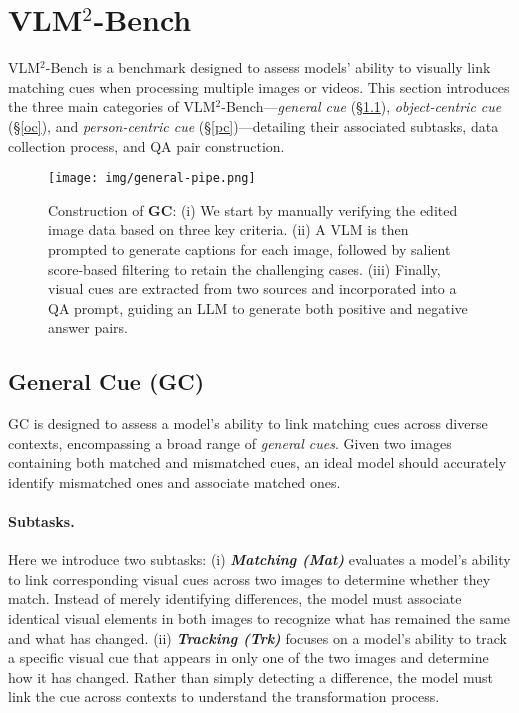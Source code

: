 \section{VLM$^2$-Bench}
VLM$^2$-Bench is a benchmark designed to assess models' ability to visually link matching cues when processing multiple images or videos. This section introduces the three main categories of VLM$^2$-Bench—\textit{general cue} (\S\ref{gc}), \textit{object-centric cue} (\S\ref{oc}), and \textit{person-centric cue} (\S\ref{pc})—detailing their associated subtasks, data collection process, and QA pair construction.

\begin{figure*}[t]
  \centering
  \texttt{[image: img/general-pipe.png]} 
  \caption{Construction of \textbf{GC}: (i) We start by manually verifying the edited image data based on three key criteria. (ii) A VLM is then prompted to generate captions for each image, followed by salient score-based filtering to retain the challenging cases. (iii) Finally, visual cues are extracted from two sources and incorporated into a QA prompt, guiding an LLM to generate both positive and negative answer pairs. 
  }
  \label{fig:gc construction}
\end{figure*}

\subsection{General Cue (GC)}
\label{gc}
GC is designed to assess a model's ability to link matching cues across diverse contexts, encompassing a broad range of \textit{general cues}. Given two images containing both matched and mismatched cues, an ideal model should accurately identify mismatched ones and associate matched ones.

\paragraph{Subtasks.}
Here we introduce two subtasks: (i) \textbf{\textit{Matching (Mat)}} evaluates a model’s ability to link corresponding visual cues across two images to determine whether they match. Instead of merely identifying differences, the model must associate identical visual elements in both images to recognize what has remained the same and what has changed. 
(ii) \textbf{\textit{Tracking (Trk)}} focuses on a model’s ability to track a specific visual cue that appears in only one of the two images and determine how it has changed. Rather than simply detecting a difference, the model must link the cue across contexts to understand the transformation process. 




